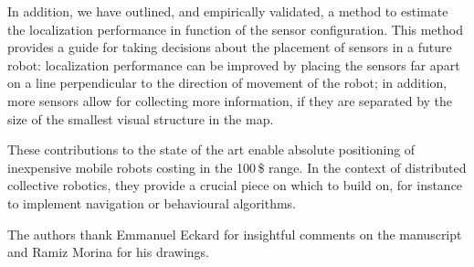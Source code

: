 \documentclass{svmult}
\begin{document}
In addition, we have outlined, and empirically validated, a method to estimate the localization performance in function of the sensor configuration.
This method provides a guide for taking decisions about the placement of sensors in a future robot:
localization performance can be improved by placing the sensors far apart on a line perpendicular to the direction of movement of the robot; in addition, more sensors allow for collecting more information, if they are separated by the size of the smallest visual structure in the map.

These contributions to the state of the art enable absolute positioning of inexpensive mobile robots costing in the 100\,\$ range.
In the context of distributed collective robotics, they provide a crucial piece on which to build on, for instance to implement navigation or behavioural algorithms.

\begin{acknowledgement}
The authors thank Emmanuel Eckard for insightful comments on the manuscript and Ramiz Morina for his drawings.
\end{acknowledgement}



\end{document}
